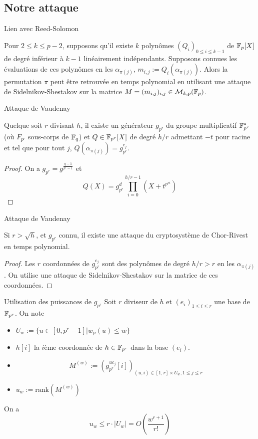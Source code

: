 \documentclass[]{beamer}
\begin{document}
\subsection{Notre attaque}

\begin{frame}{Lien avec Reed-Solomon}
\begin{theorem}
\label{thm:link}
Pour $2 \leq k \leq p-2$, supposons qu'il existe $k$ polynômes $(Q_i)_{0 \leq i \leq k-1}$ de $\mathbb{F}_p[X]$ de degré inférieur à $k-1$ linéairement indépendants. Supposons connues les évaluations de ces polynômes en les $\alpha_{\pi(j)}$, $m_{i,j} := Q_i(\alpha_{\pi(j)})$.
Alors la permutation $\pi$ peut être retrouvée en temps polynomial en utilisant une attaque de Sidelnikov-Shestakov sur la matrice $ M = (m_{i,j})_{i,j} \in \mathcal{M}_{k,p}(\mathbb{F}_p)$.
\end{theorem}
\end{frame}


\begin{frame}{Attaque de Vaudenay}
\begin{theorem}
Quelque soit  $r$ divisant $h$, il existe un générateur $g_{p^r}$ du groupe multiplicatif $\mathbb{F}_{p^r}^*$ (où $F_{p^r}$ sous-corps de $\mathbb{F}_q$) et $Q \in \mathbb{F}_{p^r}[X]$ de degré $h/r$ admettant $-t$ pour racine et tel que pour tout $j$, $Q(\alpha_{\pi(j)}) = g_{p^r}^{c_j}$.
\end{theorem}
\begin{proof}
On a $g_{p^r} = g^{\frac{q-1}{p^r-1}}$ et
$$ Q(X) = g_{p^r}^d \prod_{i=0}^{h/r-1} \left( X + t^{p^{ri}} \right) $$
\end{proof}
\end{frame}


\begin{frame}{Attaque de Vaudenay}
\begin{theorem}
Si $r > \sqrt{h}$, et $g_{p^r}$ connu, il existe une attaque du cryptosystème de Chor-Rivest en temps polynomial.
\end{theorem}
\begin{proof}
Les $r$ coordonnées de $g_{p^r}^{c_j}$ sont des polynômes de degré $h/r > r$ en les $\alpha_{\pi(j)}$.
On utilise une attaque de Sidelnikov-Shestakov sur la matrice de ces coordonnées.
\end{proof}
\end{frame}


\begin{frame}{Utilisation des puissances de $g_{p^r}$}
Soit $r$ diviseur de $h$ et $(e_i)_{1 \leq i \leq r}$ une base de $\mathbb{F}_{p^r}$. On note
\begin{itemize}
\item $ U_w := \{ u \in [0,p^r-1] | w_p(u) \leq w \} $
\item $h[i]$ la $i$ème coordonnée de $h \in \mathbb{F}_{p^r}$ dans la base $(e_i)$.
\item $$ M^{(w)} := \left(g_{p^r}^{uc_j}[i] \right)_{(u,i) \in [1,r] \times U_w , 1 \leq j \leq r}$$
\item $u_w := \text{rank} \left( M^{(w)} \right)$
\end{itemize}
On a
$$ u_w \leq r \cdot |U_w| = O\left( \frac{w^{r+1}}{r!} \right) $$


\end{frame}
\end{document}
